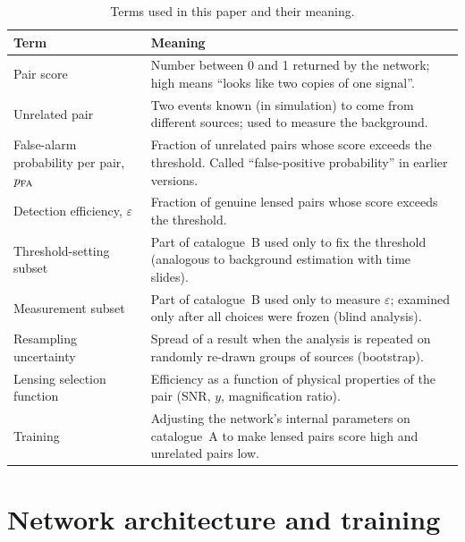 \documentclass[aps,prd,twocolumn,superscriptaddress,nofootinbib,floatfix]{revtex4-2}
\newcommand{\pfa}{p_{\rm FA}}
\newcommand{\eff}{\varepsilon}
\begin{document}
\begin{table}[h]
\caption{Terms used in this paper and their meaning.}
\label{tab:glossary}
\begin{ruledtabular}
\begin{tabular}{p{}p{}}
Term & Meaning \\
\hline
Pair score & Number between 0 and 1 returned by the network; high means ``looks like two copies of one signal''. \\
Unrelated pair & Two events known (in simulation) to come from different sources; used to measure the background. \\
False-alarm probability per pair, $\pfa$ & Fraction of unrelated pairs whose score exceeds the threshold. Called ``false-positive probability'' in earlier versions. \\
Detection efficiency, $\eff$ & Fraction of genuine lensed pairs whose score exceeds the threshold. \\
Threshold-setting subset & Part of catalogue~B used only to fix the threshold (analogous to background estimation with time slides). \\
Measurement subset & Part of catalogue~B used only to measure $\eff$; examined only after all choices were frozen (blind analysis). \\
Resampling uncertainty & Spread of a result when the analysis is repeated on randomly re-drawn groups of sources (bootstrap). \\
Lensing selection function & Efficiency as a function of physical properties of the pair (SNR, $y$, magnification ratio). \\
Training & Adjusting the network's internal parameters on catalogue~A to make lensed pairs score high and unrelated pairs low. \\
\end{tabular}
\end{ruledtabular}
\end{table}

\section{Network architecture and training}
\label{app:architecture}
\end{document}
